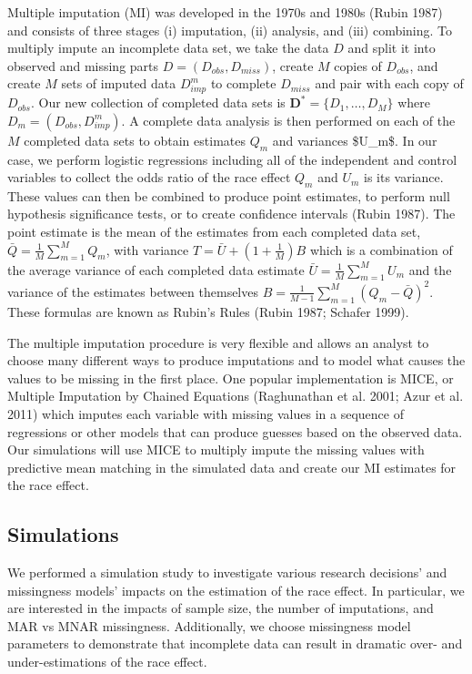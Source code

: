 \documentclass[
  letterpaper,
  DIV=11,
  numbers=noendperiod]{scrartcl}
\begin{document}
Multiple imputation (MI) was developed in the 1970s and 1980s (Rubin
1987) and consists of three stages (i) imputation, (ii) analysis, and
(iii) combining. To multiply impute an incomplete data set, we take the
data \(D\) and split it into observed and missing parts
\(D = (D_{obs}, D_{miss})\), create \(M\) copies of \(D_{obs}\), and
create \(M\) sets of imputed data \(D_{imp}^m\) to complete \(D_{miss}\)
and pair with each copy of \(D_{obs}\). Our new collection of completed
data sets is \(\mathbf{D}^* = \{D_1,…, D_M\}\) where
\(D_m = (D_{obs}, D_{imp}^m)\). A complete data analysis is then
performed on each of the \(M\) completed data sets to obtain estimates
\(Q_m\) and variances \$U\_m\$. In our case, we perform logistic
regressions including all of the independent and control variables to
collect the odds ratio of the race effect \(Q_m\) and \(U_m\) is its
variance. These values can then be combined to produce point estimates,
to perform null hypothesis significance tests, or to create confidence
intervals (Rubin 1987). The point estimate is the mean of the estimates
from each completed data set,
\(\bar{Q} = \frac{1}{M} \sum_{m=1}^M Q_m\), with variance
\(T = \bar{U} + (1 + \frac{1}{M})B\) which is a combination of the
average variance of each completed data estimate
\(\bar{U} = \frac{1}{M}\sum_{m=1}^M U_m\) and the variance of the
estimates between themselves
\(B = \frac{1}{M-1}\sum_{m=1}^M (Q_m - \bar{Q})^2\). These formulas are
known as Rubin's Rules (Rubin 1987; Schafer 1999).

The multiple imputation procedure is very flexible and allows an analyst
to choose many different ways to produce imputations and to model what
causes the values to be missing in the first place. One popular
implementation is MICE, or Multiple Imputation by Chained Equations
(Raghunathan et al. 2001; Azur et al. 2011) which imputes each variable
with missing values in a sequence of regressions or other models that
can produce guesses based on the observed data. Our simulations will use
MICE to multiply impute the missing values with predictive mean matching
in the simulated data and create our MI estimates for the race effect.

\hypertarget{sec-simulations}{%
\subsection{Simulations}\label{sec-simulations}}

We performed a simulation study to investigate various research
decisions' and missingness models' impacts on the estimation of the race
effect. In particular, we are interested in the impacts of sample size,
the number of imputations, and MAR vs MNAR missingness. Additionally, we
choose missingness model parameters to demonstrate that incomplete data
can result in dramatic over- and under-estimations of the race effect.
\end{document}
